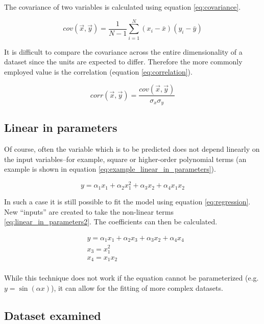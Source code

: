 \documentclass{IEEEtran}
\begin{document}
The covariance of two variables is calculated using equation \eqref{eq:covariance}.

\begin{equation}
	cov(\vec{x}, \vec{y}) = \frac{1}{N-1} \sum^N_{i=1} (x_i - \bar{x}) (y_i - \bar{y})
	\label{eq:covariance}
\end{equation}

It is difficult to compare the covariance across the entire dimensionality of a dataset since the units are expected to differ. Therefore the more commonly employed value is the correlation (equation \eqref{eq:correlation}).

\begin{equation}
	corr(\vec{x}, \vec{y}) = \frac{cov(\vec{x}, \vec{y})}{\sigma_x \sigma_y}
	\label{eq:correlation}
\end{equation}

\subsection{Linear in parameters}

Of course, often the variable which is to be predicted does not depend linearly on the input variables--for example, square or higher-order polynomial terms (an example is shown in equation \eqref{eq:example_linear_in_parameters}).

\begin{equation}
	y = \alpha_1 x_1 + \alpha_2 x_1^2 + \alpha_3 x_2 + \alpha_4 x_1 x_2
	\label{eq:example_linear_in_parameters}
\end{equation}

In such a case it is still possible to fit the model using equation \eqref{eq:regression}. New ``inputs'' are created to take the non-linear terms \eqref{eq:linear_in_parameters2}. The coefficients can then be calculated.

\begin{align}
	&y = \alpha_1 x_1 + \alpha_2 x_3 + \alpha_3 x_2 + \alpha_4 x_4 \nonumber \\
	&x_3 = x_1^2 \nonumber \\
	&x_4 = x_1 x_2 \nonumber \\
	\label{eq:linear_in_parameters2}
\end{align}

While this technique does not work if the equation cannot be parameterized (e.g. $y=\sin(\alpha x)$), it can allow for the fitting of more complex datasets.

\subsection{Dataset examined}
\end{document}

